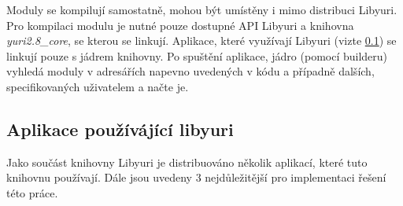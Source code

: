 \documentclass[thesis=M,czech]{FITthesis}[2012/06/26]
\begin{document}
Moduly se kompilují samostatně, mohou být umístěny i mimo distribuci Libyuri. Pro kompilaci modulu je nutné pouze dostupné API Libyuri a knihovna \textit{yuri2.8\_core}, se kterou se linkují. Aplikace, které využívají Libyuri (vizte \ref{subsec:analyza_yuri_aplikace}) se linkují pouze s jádrem knihovny. Po spuštění aplikace, jádro (pomocí builderu) vyhledá moduly v adresářích napevno uvedených v kódu a případně dalších, specifikovaných uživatelem a načte je.

\subsection{Aplikace používájící libyuri} \label{subsec:analyza_yuri_aplikace}
Jako součást knihovny Libyuri je distribuováno několik aplikací, které tuto knihovnu používají. Dále jsou uvedeny 3 nejdůležitější pro implementaci řešení této práce.\\
\end{document}
